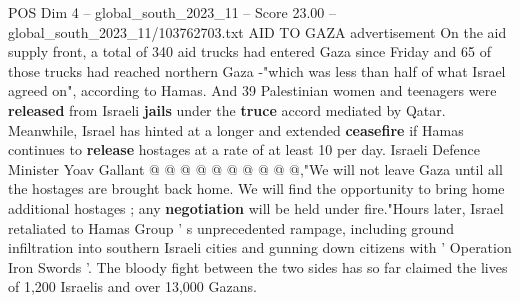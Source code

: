 \begin{textsample}{POS Dim 4 – global\_south\_2023\_11 – Score 23.00 – global\_south\_2023\_11/103762703.txt}
AID TO GAZA advertisement On the aid supply front, a total of 340 aid trucks had entered Gaza since Friday and 65 of those trucks had reached northern Gaza -"which was less than half of what Israel agreed on", according to Hamas.
And 39 Palestinian women and teenagers were \textbf{released} from Israeli \textbf{jails} under the \textbf{truce} accord mediated by Qatar.
Meanwhile, Israel has hinted at a longer and extended \textbf{ceasefire} if Hamas continues to \textbf{release} hostages at a rate of at least 10 per day.
Israeli Defence Minister Yoav Gallant @ @ @ @ @ @ @ @ @ @,"We will not leave Gaza until all the hostages are brought back home.
We will find the opportunity to bring home additional hostages ; any \textbf{negotiation} will be held under fire."Hours later, Israel retaliated to Hamas Group ' s unprecedented rampage, including ground infiltration into southern Israeli cities and gunning down citizens with ' Operation Iron Swords '.
The bloody fight between the two sides has so far claimed the lives of 1,200 Israelis and over 13,000 Gazans.

\end{textsample}
